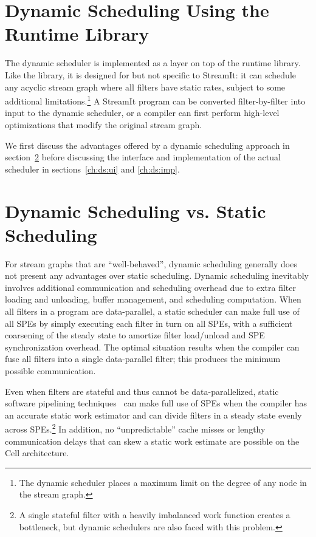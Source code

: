 \section{Dynamic Scheduling Using the Runtime Library}\label{ch:ds}

The dynamic scheduler is implemented as a layer on top of the runtime library. Like the library, it is designed for but not specific to StreamIt: it can schedule any acyclic stream graph where all filters have static rates, subject to some additional limitations.\footnote{The dynamic scheduler places a maximum limit on the degree of any node in the stream graph.} A StreamIt program can be converted filter-by-filter into input to the dynamic scheduler, or a compiler can first perform high-level optimizations that modify the original stream graph.

We first discuss the advantages offered by a dynamic scheduling approach in section~\ref{ch:ds:bg} before discussing the interface and implementation of the actual scheduler in sections~\ref{ch:ds:ui} and \ref{ch:ds:imp}.

\section{Dynamic Scheduling vs. Static Scheduling}\label{ch:ds:bg}

For stream graphs that are ``well-behaved'', dynamic scheduling generally does not present any advantages over static scheduling. Dynamic scheduling inevitably involves additional communication and scheduling overhead due to extra filter loading and unloading, buffer management, and scheduling computation. When all filters in a program are data-parallel, a static scheduler can make full use of all SPEs by simply executing each filter in turn on all SPEs, with a sufficient coarsening of the steady state to amortize filter load/unload and SPE synchronization overhead. The optimal situation results when the compiler can fuse all filters into a single data-parallel filter; this produces the minimum possible communication.

Even when filters are stateful and thus cannot be data-parallelized, static software pipelining techniques~\cite{asplos06} can make full use of SPEs when the compiler has an accurate static work estimator and can divide filters in a steady state evenly across SPEs.\footnote{A single stateful filter with a heavily imbalanced work function creates a bottleneck, but dynamic schedulers are also faced with this problem.} In addition, no ``unpredictable'' cache misses or lengthy communication delays that can skew a static work estimate are possible on the Cell architecture.

